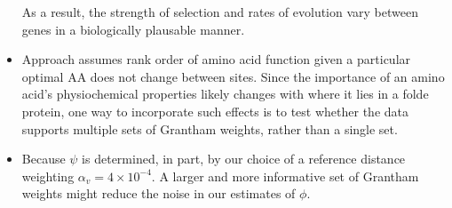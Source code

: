 \documentclass{article}
\newcommand{\alphav}{\ensuremath{\alpha_v}\xspace}
\newcommand{\alphavValue}{\ensuremath{4 \times 10^{-4}}\xspace}
\begin{document}
\begin{itemize}
  As a result, the strength of selection and rates of evolution vary between genes in a biologically plausable manner.
\item Approach assumes rank order of amino acid function given a particular optimal AA does not change between sites. 
Since the importance of an amino acid's physiochemical properties likely changes with where it lies in a folde protein, one way to incorporate such effects is to test whether the data supports multiple sets of Grantham weights, rather than a single set.
\item Because $\psi$ is determined, in part, by our choice of a reference distance weighting $\alphav = \alphavValue$. 
  A larger and more informative set of Grantham weights might reduce the noise in our estimates of $\phi$.
\end{itemize}
\end{document}

